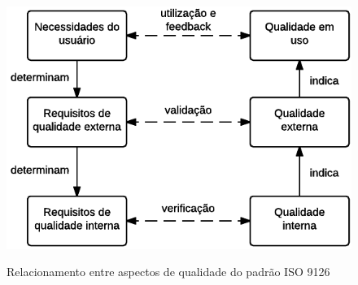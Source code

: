 \documentclass[
	12pt,				%
	openright,			%
	oneside,			%
	a4paper,			%
	english,			%
	brazil,				%
	]{abntex2}
\begin{document}
\begin{figure}[h]
    \centering
    \caption{Relacionamento entre aspectos de qualidade do padrão ISO 9126}
    \graphicspath{ {./graphics/} }
    \includegraphics[scale=0.95]{iso9126-hierarquia_relacionamento-andrei}
    \label{fig:iso9126-hierarquia_relacionamento}
\end{figure}
\end{document}
